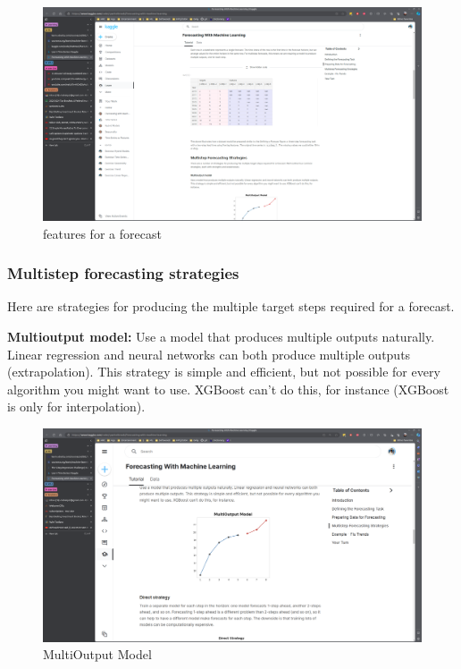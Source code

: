 \documentclass[12pt]{report}
\begin{document}
\begin{figure}[htbp]
  \begin{center}
    \includegraphics[trim =30cm 22.0cm 30cm 16.5cm, clip, scale=0.4]{pics/table.png}
    \caption{features for a forecast}
    \label{fig:table}
  \end{center}
\end{figure}

\subsubsection{Multistep forecasting strategies}
Here are strategies for producing the multiple target steps required for a forecast.


\textbf{Multioutput model:} Use a model that produces multiple outputs naturally. Linear regression and neural networks can both produce multiple outputs (extrapolation). This strategy is simple and efficient, but not possible for every algorithm you might want to use. XGBoost can't do this, for instance (XGBoost is only for interpolation).

\begin{figure}[htbp]
  \begin{center}
    \includegraphics[trim =35cm 14.0cm 33cm 19cm, clip, scale=0.3]{pics/forecast1.png}
    \caption{MultiOutput Model}
    \label{fig:multiouput}
  \end{center}
\end{figure}
\end{document}
